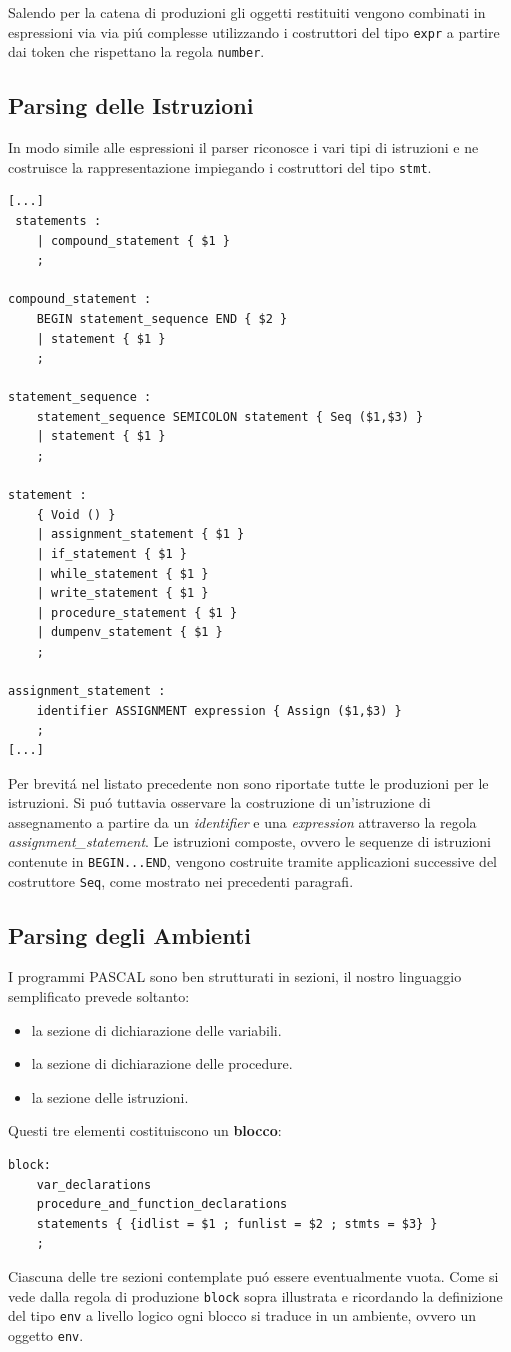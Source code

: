 \documentclass[a4paper,10pt]{article}
\begin{document}
Salendo per la catena di produzioni gli oggetti restituiti vengono combinati in
espressioni via via pi\'u complesse utilizzando i costruttori del tipo 
\verb|expr| a partire dai token che rispettano la regola \texttt{number}.

\subsection{Parsing delle Istruzioni}
In modo simile alle espressioni il parser riconosce i vari tipi di istruzioni e 
ne costruisce la rappresentazione impiegando i costruttori del tipo \verb|stmt|.
\begin{verbatim}
[...]
 statements :
    | compound_statement { $1 }
    ;

compound_statement :
    BEGIN statement_sequence END { $2 }
    | statement { $1 }
    ;

statement_sequence :
    statement_sequence SEMICOLON statement { Seq ($1,$3) }
    | statement { $1 }
    ;

statement :
    { Void () }
    | assignment_statement { $1 }
    | if_statement { $1 }
    | while_statement { $1 }
    | write_statement { $1 }
    | procedure_statement { $1 }
    | dumpenv_statement { $1 }
    ;

assignment_statement :
    identifier ASSIGNMENT expression { Assign ($1,$3) }
    ;
[...]
\end{verbatim}

Per brevit\'a nel listato precedente non sono riportate tutte le produzioni per
le istruzioni. Si pu\'o tuttavia osservare la costruzione di un'istruzione di
assegnamento a partire da un \textit{identifier} e una \textit{expression}
attraverso la regola \textit{assignment\_statement}. Le istruzioni composte,
ovvero le sequenze di istruzioni contenute in \texttt{BEGIN...END}, vengono
costruite tramite applicazioni successive del costruttore \texttt{Seq}, come
mostrato nei precedenti paragrafi.

\subsection{Parsing degli Ambienti}
I programmi PASCAL sono ben strutturati in sezioni, il nostro
linguaggio semplificato prevede soltanto: 
\begin{itemize}
 \item la sezione di dichiarazione delle variabili.
 \item la sezione di dichiarazione delle procedure.
 \item la sezione delle istruzioni.
\end{itemize}
Questi tre elementi costituiscono un \textbf{blocco}: 
\begin{verbatim}
block:
    var_declarations
    procedure_and_function_declarations
    statements { {idlist = $1 ; funlist = $2 ; stmts = $3} }
    ;
\end{verbatim}
Ciascuna delle tre sezioni contemplate pu\'o essere eventualmente vuota.
Come si vede dalla regola di produzione \texttt{block} sopra illustrata e
ricordando la definizione del tipo \texttt{env} a livello logico ogni blocco si
traduce in un ambiente, ovvero un oggetto \texttt{env}.
\end{document}
